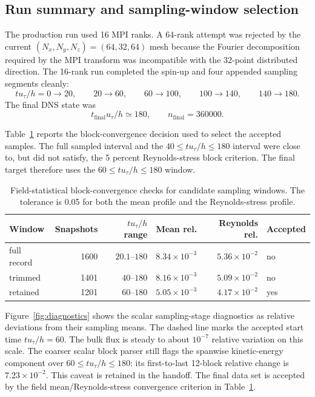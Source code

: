 \documentclass[11pt]{article}
\begin{document}
\subsection{Run summary and sampling-window selection}

The production run used 16 MPI ranks. A 64-rank attempt was rejected by the
current \((N_x,N_y,N_z)=(64,32,64)\) mesh because the Fourier decomposition
required by the MPI transform was incompatible with the 32-point distributed
direction.
The 16-rank run completed the spin-up and four appended sampling segments
cleanly:
\[
  t u_{\tau}/h=0\to20,\qquad
  20\to60,\qquad
  60\to100,\qquad
  100\to140,\qquad
  140\to180.
\]
The final DNS state was
\[
  t_{\mathrm{final}}u_{\tau}/h \simeq 180,\qquad n_{\mathrm{final}}=360000.
\]

Table~\ref{tab:window_convergence} reports the block-convergence decision used
to select the accepted samples. The full sampled interval and the
\(40\le t u_{\tau}/h\le180\) interval were close to, but did not satisfy, the
5 percent Reynolds-stress block criterion. The final target therefore uses
the \(60\le t u_{\tau}/h\le180\) window.

\begin{table}[t]
  \centering
  \caption{Field-statistical block-convergence checks for candidate sampling
  windows. The tolerance is 0.05 for both the mean profile and the
  Reynolds-stress profile.}
  \label{tab:window_convergence}
  \begin{tabular}{lrrrrl}
    \toprule
    Window & Snapshots & \(t u_{\tau}/h\) range & Mean rel. & Reynolds rel. & Accepted \\
    \midrule
    full record & 1600 & \(20.1\)--\(180\) & \(8.34\times10^{-3}\) & \(5.36\times10^{-2}\) & no \\
    trimmed & 1401 & \(40\)--\(180\) & \(8.16\times10^{-3}\) & \(5.09\times10^{-2}\) & no \\
    retained & 1201 & \(60\)--\(180\) & \(5.05\times10^{-3}\) & \(4.17\times10^{-2}\) & yes \\
    \bottomrule
  \end{tabular}
\end{table}

Figure~\ref{fig:diagnostics} shows the scalar sampling-stage diagnostics as
relative deviations from their sampling means. The dashed line marks the
accepted start time \(t u_{\tau}/h=60\). The bulk flux is steady to about \(10^{-7}\)
relative variation on this scale. The coarser scalar block parser still flags
the spanwise kinetic-energy component over \(60\le t u_{\tau}/h\le180\): its
first-to-last 12-block relative change is \(7.23\times10^{-2}\). This caveat
is retained in the handoff. The final data set is accepted by the field
mean/Reynolds-stress convergence criterion in Table~\ref{tab:window_convergence}.
\end{document}
